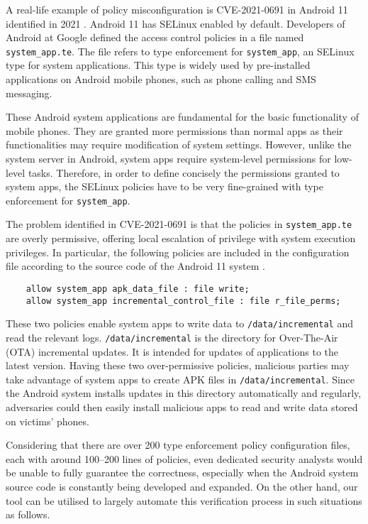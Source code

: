 \documentclass[acmsmall,screen,nonacm]{acmart}
\begin{document}
A real-life example of policy misconfiguration is CVE-2021-0691 in Android 11 
identified in 2021 \cite{CVE-2021-0691}. Android 11 has SELinux enabled by 
default. Developers of Android at Google defined the access control policies in 
a file named \texttt{system\_app.te}. The file refers to type enforcement for 
\texttt{system\_app}, an SELinux type for system applications. This type is 
widely used by pre-installed applications on Android mobile phones, such as 
phone calling and SMS messaging.

These Android system applications are fundamental for the basic functionality 
of mobile phones. They are granted more permissions than normal apps as their 
functionalities may require modification of system settings. However, unlike 
the system server in Android, system apps require system-level permissions for 
low-level tasks. Therefore, in order to define concisely the permissions 
granted to system apps, the SELinux policies have to be very fine-grained with 
type enforcement for \texttt{system\_app}.

The problem identified in CVE-2021-0691 is that the policies in 
\texttt{system\_app.te} are overly permissive, offering local escalation of 
privilege with system execution privileges. In particular, the following 
policies are included in the configuration file according to the source code of 
the Android 11 system \cite{android11}.
\begin{verbatim}
    allow system_app apk_data_file : file write;
    allow system_app incremental_control_file : file r_file_perms;
\end{verbatim}

These two policies enable system apps to write data to 
\texttt{/data/incremental} and read the relevant logs. 
\texttt{/data/incremental} is the directory for Over-The-Air (OTA) incremental 
updates. It is intended for updates of applications to the latest version. 
Having these two over-permissive policies, malicious parties may take advantage 
of system apps to create APK files in \texttt{/data/incremental}. Since the 
Android system installs updates in this directory automatically and regularly, 
adversaries could then easily install malicious apps to read and write data 
stored on victims' phones.

Considering that there are over 200 type enforcement policy configuration 
files, each with around 100--200 lines of policies, even dedicated security 
analysts would be unable to fully guarantee the correctness, especially when 
the Android system source code is constantly being developed and expanded. On 
the other hand, our tool can be utilised to largely automate this verification 
process in such situations as follows.
\end{document}
